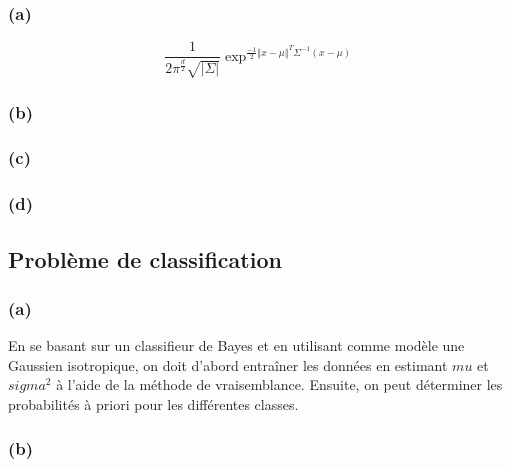 \documentclass{article}
\begin{document}
	\subsubsection*{(a)}
	\begin{equation}
	\frac{1}{2\pi^{\frac{d}{2}}\sqrt{\vert\Sigma\vert}}\exp^{\frac{-1}{2}\Vert x-\mu\Vert^T{\Sigma^{-1}}(x-\mu)}
	\end{equation}
	\subsubsection*{(b)}
	
	\subsubsection*{(c)}
	
	\subsubsection*{(d)}
	
	
	\subsection{Problème de classification}
		
	\subsubsection*{(a)}
	En se basant sur un classifieur de Bayes et en utilisant comme modèle une Gaussien isotropique, on doit d'abord entraîner les données en estimant $mu$ et $sigma^2$ à l'aide de la méthode de vraisemblance.
	Ensuite, on peut déterminer les probabilités à priori pour les différentes classes.
		
	\subsubsection*{(b)}
	
\end{document}
